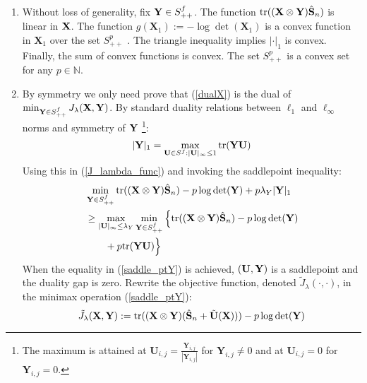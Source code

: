 \begin{IEEEproof}
\begin{enumerate}
	\item Without loss of generality, fix ${\mathbf{Y}}\in S_{++}^f$. The function ${ \text{tr} }(({\mathbf{X}} \otimes {\mathbf{Y}})\hat{{\mathbf{S}}}_n)$ is linear in ${\mathbf{X}}$.	The function $g(\mathbf{X}_1):=-\log\det(\mathbf{X}_1)$ is a convex function in $\mathbf{X}_1$ over the set $S_{++}^p$ \cite{ConvexOpt}. The triangle inequality implies $|\cdot|_1$ is convex. Finally, the sum of convex functions is convex.	The set $S_{++}^p$ is a convex set for any $p\in \mathbb{N}$.
	\item By symmetry we only need prove that (\ref{dualX}) is the dual of $\min_{\mathbf{Y}\in S_{++}^f} J_\lambda({\mathbf{X}},{\mathbf{Y}})$. By standard duality relations between $\ell_1$ and $\ell_\infty$ norms \cite{ConvexOpt} and symmetry of ${\mathbf{Y}}$ \footnote{ The maximum is attained at $\mathbf{U}_{i,j}= \frac{\mathbf{Y}_{i,j}}{|\mathbf{Y}_{i,j}|}$ for $\mathbf{Y}_{i,j}\neq 0$ and at $\mathbf{U}_{i,j}=0$ for $\mathbf{Y}_{i,j}=0$.}: 
	\begin{equation*}
		|\mathbf{Y}|_1=\max_{\mathbf{U}\in S^f: |\mathbf{U}|_{\infty}\leq 1}{{ \text{tr} }(\mathbf{Y}\mathbf{U})}
	\end{equation*}
	Using this in (\ref{J_lambda_func}) and invoking the saddlepoint inequality:
	\begin{align}
	  &\min_{\mathbf{Y}\in S_{++}^f}  {{ \text{tr} }((\mathbf{X}\otimes \mathbf{Y})\hat{{\mathbf{S}}}_n)-p\log\det(\mathbf{Y})+p\lambda_Y |{\mathbf{Y}}|_1} \nonumber \\
	    &\geq \max_{|\mathbf{U}|_{\infty}\leq \lambda_Y} \min_{\mathbf{Y}\in S_{++}^f} \Big\{ { \text{tr} }((\mathbf{X}\otimes \mathbf{Y})\hat{{\mathbf{S}}}_n)-p\log\det(\mathbf{Y}) \nonumber \\
	    & \qquad +p { \text{tr} }(\mathbf{Y}\mathbf{U}) \Big\} \label{saddle_ptY}
	\end{align}
When the equality in (\ref{saddle_ptY}) is achieved, $({\mathbf{U}},\mathbf{Y})$ is a saddlepoint and the duality gap is zero. Rewrite the objective function, denoted $\tilde{J}_\lambda(\cdot,\cdot)$, in the minimax operation (\ref{saddle_ptY}):
	\begin{equation*}
		\tilde{J}_\lambda(\bX,\bY):= \tr((\bX\otimes \bY)(\hat{\bS}_n+\tilde{\bU}(\bX)))-p\log\det(\bY)

\end{equation*}
\end{enumerate}
\end{IEEEproof}
